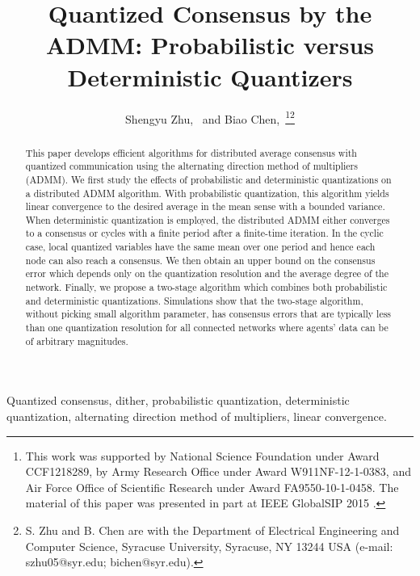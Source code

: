 \documentclass[journal]{IEEEtran}
\begin{document}
\title{Quantized Consensus by the ADMM: Probabilistic versus Deterministic Quantizers}
\author{Shengyu Zhu,~ and Biao Chen,~\thanks{This work was supported by National Science Foundation under Award CCF1218289,  by Army Research Office under Award W911NF-12-1-0383, and Air Force Office of Scientific Research under Award FA9550-10-1-0458. The material of this paper was presented in part at IEEE GlobalSIP 2015 \cite{Zhu2015a}.}\thanks{S. Zhu and B. Chen are with the Department of Electrical Engineering and Computer Science, Syracuse University, Syracuse, NY 13244 USA (e-mail: szhu05@syr.edu; bichen@syr.edu).}}

\maketitle

\begin{abstract}
This paper develops efficient algorithms for distributed average consensus with quantized communication using the alternating direction method of multipliers (ADMM). We first study the effects of probabilistic and deterministic quantizations on a distributed ADMM algorithm. With probabilistic quantization, this algorithm yields linear convergence to the desired average in the mean sense with a bounded variance. When deterministic quantization is employed, the distributed ADMM either converges to a consensus or cycles with a finite period after a finite-time iteration. In the cyclic case, local quantized variables have the same mean over one period and hence each node can also reach a consensus. We then obtain an upper bound on the consensus error which depends only on the quantization resolution and the average degree of the network. Finally, we propose a two-stage algorithm which combines both probabilistic and deterministic quantizations. Simulations show that the two-stage algorithm, without picking small algorithm parameter, has consensus errors that are typically less than {one} quantization resolution for {all} connected networks where agents' data can be of {arbitrary magnitudes}. \end{abstract}
\begin{IEEEkeywords}
Quantized consensus, dither, probabilistic quantization, deterministic quantization, alternating direction method of multipliers, linear convergence.
\end{IEEEkeywords}
\end{document}
